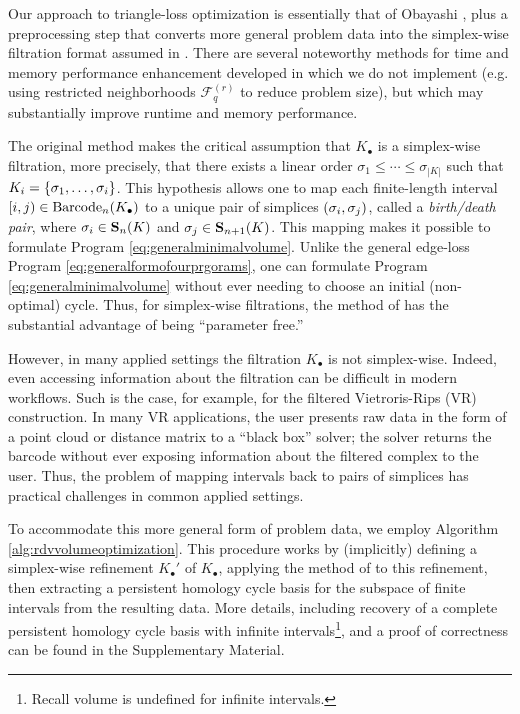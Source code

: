 Our approach to triangle-loss optimization is essentially that of Obayashi \cite{Obayashi2018}, plus a preprocessing step that converts more general problem data into the simplex-wise filtration format assumed in \cite{Obayashi2018}.  There are several noteworthy methods for time and memory performance enhancement developed in \cite{Obayashi2018}  which we do not implement (e.g.  using restricted neighborhoods $\mathcal{F}_q^{(r)}$ to reduce problem size), but which may substantially improve runtime and memory performance.
 
The original method makes the critical assumption that $K_\bullet$ is a simplex-wise filtration, more precisely, that there exists a linear order $\sigma_1 \le \cdots \le \sigma_{|K|}$ such that $K_i = \{\sigma_1, \ldots, \sigma_i\}$. This hypothesis allows one to map each finite-length interval $[i,j) \in \mathrm{Barcode}_n(K_\bullet)$ to a unique pair of simplices $(\sigma_i, \sigma_j)$, called a \emph{birth/death pair}, where  $\sigma_i \in \mathbf{S}_n(K)$ and $\sigma_j \in \mathbf{S}_{n+1}(K)$.    This mapping makes it possible to formulate Program \eqref{eq:generalminimalvolume}. Unlike the general edge-loss Program \eqref{eq:generalformofourprgorams}, one can formulate Program \eqref{eq:generalminimalvolume} without ever needing to choose an initial (non-optimal) cycle.  Thus, for simplex-wise filtrations, the method of \cite{Obayashi2018} has the substantial advantage of being ``parameter free.''

 
However, in many applied settings the filtration $K_\bullet$ is not simplex-wise.   Indeed, even accessing information about the filtration can be difficult in modern workflows.  Such is the case, for example, for the filtered Vietroris-Rips (VR) construction. In many VR applications, the user  presents raw data in the form of a point cloud or distance matrix to a ``black box'' solver; the solver returns the barcode without ever exposing information about the filtered complex to the user. Thus, the problem of mapping intervals back to pairs of simplices has practical challenges in common applied settings.




 
To accommodate this more general form of problem data, we employ Algorithm \ref{alg:rdvvolumeoptimization}.  This procedure works by (implicitly) defining a simplex-wise refinement $K_\bullet'$ of $K_\bullet$, applying the method of \cite{Obayashi2018} to this refinement, then extracting a persistent homology cycle basis for the subspace of finite intervals from the resulting data.
 More details, including recovery of a complete persistent homology cycle basis with infinite intervals\footnote{Recall volume is undefined for infinite intervals.}, and a proof of correctness can be found in the Supplementary Material.

